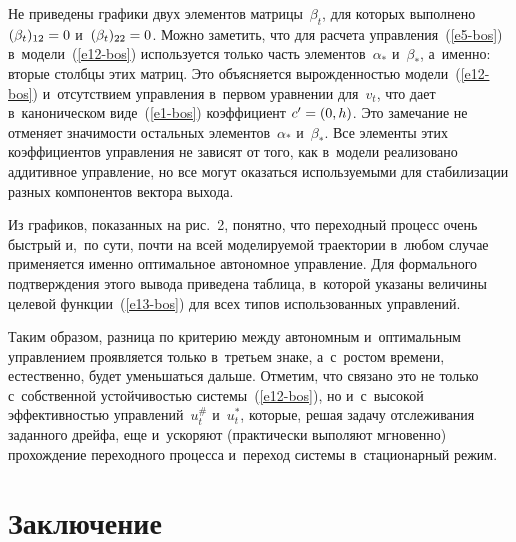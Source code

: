 \begin{multicols}{2}
     Не приведены графики двух элементов матрицы~$\beta_t$, для которых 
выполнено $(\beta_t)_{12}\hm=0$ и~$(\beta_t)_{22}\hm=0$. Можно заметить, что 
для расчета управ\-ле\-ния~(\ref{e5-bos}) в~модели~(\ref{e12-bos}) используется 
только часть элементов~$\alpha_*$ и~$\beta_*$, а~именно: вторые столбцы 
этих матриц. Это объясняется вырожденностью модели~(\ref{e12-bos}) 
и~отсутствием управ\-ле\-ния в~первом уравнении для~$v_t$, что дает 
в~каноническом виде~(\ref{e1-bos}) коэффициент $c^\prime\hm= (0,h)$. Это 
замечание не отменяет значимости остальных элементов~$\alpha_*$ 
и~$\beta_*$. Все элементы этих коэффициентов управ\-ле\-ния не зависят от 
того, как в~модели реализовано аддитивное управ\-ле\-ние, но все могут 
оказаться используемыми для стабилизации разных компонентов вектора 
выхода.
     
     Из графиков, показанных на рис.~2, понятно, что переходный процесс 
очень быст\-рый и,~по сути, почти на всей моделируемой траектории в~любом 
случае применяется именно оптимальное автономное управ\-ле\-ние. Для 
формального под\-тверж\-де\-ния этого вывода приведена таб\-ли\-ца, 
в~которой указаны величины целевой функции~(\ref{e13-bos}) для всех 
типов использованных управ\-ле\-ний.

Таким образом, разница по критерию между автономным и~оптимальным управ\-ле\-ни\-ем 
проявляется только в~третьем знаке, а~с~ростом времени, естественно, 
будет уменьшаться дальше. Отметим, что связано это не только с~собственной устой\-чи\-востью сис\-те\-мы~(\ref{e12-bos}), 
но и~с~высокой эф\-фек\-тив\-ностью управ\-ле\-ний~$u_t^\#$  и~$u_t^*$, 
которые, решая задачу отслеживания заданного дрейфа, еще и~ускоряют (практически выполяют мгно\-вен\-но) 
про\-хож\-де\-ние переходного процесса и~переход сис\-те\-мы в~стационарный режим.

 
   
     
\section{Заключение}



\end{multicols}
